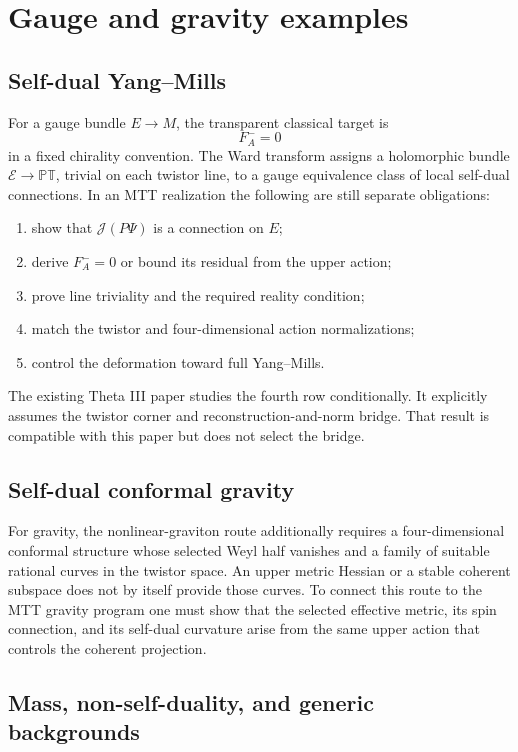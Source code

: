 \documentclass[11pt]{article}
\newcommand{\PT}{\mathbb{PT}}
\begin{document}
\section{Gauge and gravity examples}

\subsection{Self-dual Yang--Mills}

For a gauge bundle \(E\to M\), the transparent classical target is
\[
F^-_A=0
\]
in a fixed chirality convention. The Ward transform assigns a holomorphic
bundle \(\mathcal E\to\PT\), trivial on each twistor line, to a gauge
equivalence class of local self-dual connections. In an MTT realization the
following are still separate obligations:
\begin{enumerate}
\item show that \(\mathcal J(P\Psi)\) is a connection on \(E\);
\item derive \(F^-_A=0\) or bound its residual from the upper action;
\item prove line triviality and the required reality condition;
\item match the twistor and four-dimensional action normalizations;
\item control the deformation toward full Yang--Mills.
\end{enumerate}

The existing Theta III paper studies the fourth row conditionally. It
explicitly assumes the twistor corner and reconstruction-and-norm bridge.
That result is compatible with this paper but does not select the bridge.

\subsection{Self-dual conformal gravity}

For gravity, the nonlinear-graviton route additionally requires a
four-dimensional conformal structure whose selected Weyl half vanishes and
a family of suitable rational curves in the twistor space. An upper metric
Hessian or a stable coherent subspace does not by itself provide those
curves. To connect this route to the MTT gravity program one must show that
the selected effective metric, its spin connection, and its self-dual
curvature arise from the same upper action that controls the coherent
projection.

\subsection{Mass, non-self-duality, and generic backgrounds}
\end{document}
